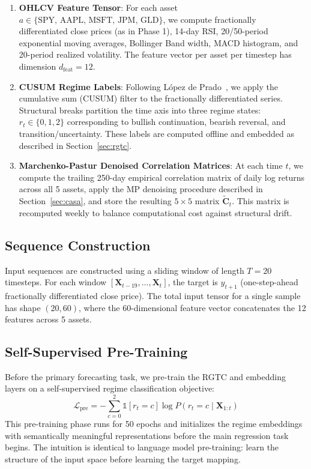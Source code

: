 \documentclass[conference]{IEEEtran}
\begin{document}
\begin{enumerate}[leftmargin=*]
    \item \textbf{OHLCV Feature Tensor}: For each asset $a \in \{\text{SPY, AAPL, MSFT, JPM, GLD}\}$, we compute fractionally differentiated close prices (as in Phase 1), 14-day RSI, 20/50-period exponential moving averages, Bollinger Band width, MACD histogram, and 20-period realized volatility. The feature vector per asset per timestep has dimension $d_{\text{feat}} = 12$.

    \item \textbf{CUSUM Regime Labels}: Following L\'{o}pez de Prado~\cite{lopez2018advances}, we apply the cumulative sum (CUSUM) filter to the fractionally differentiated series. Structural breaks partition the time axis into three regime states: $r_t \in \{0, 1, 2\}$ corresponding to bullish continuation, bearish reversal, and transition/uncertainty. These labels are computed offline and embedded as described in Section~\ref{sec:rgtc}.

    \item \textbf{Marchenko-Pastur Denoised Correlation Matrices}: At each time $t$, we compute the trailing 250-day empirical correlation matrix of daily log returns across all 5 assets, apply the MP denoising procedure described in Section~\ref{sec:casa}, and store the resulting $5 \times 5$ matrix $\tilde{\mathbf{C}}_t$. This matrix is recomputed weekly to balance computational cost against structural drift.
\end{enumerate}

\subsection{Sequence Construction}

Input sequences are constructed using a sliding window of length $T = 20$ timesteps. For each window $[\mathbf{X}_{t-19}, \ldots, \mathbf{X}_t]$, the target is $y_{t+1}$ (one-step-ahead fractionally differentiated close price). The total input tensor for a single sample has shape $(20, 60)$, where the 60-dimensional feature vector concatenates the 12 features across 5 assets.

\subsection{Self-Supervised Pre-Training}

Before the primary forecasting task, we pre-train the RGTC and embedding layers on a self-supervised regime classification objective:
\begin{equation}
\mathcal{L}_{\text{pre}} = -\sum_{c=0}^{2} \mathbb{1}[r_t = c] \log P(r_t = c \mid \mathbf{X}_{1:t})
\end{equation}
This pre-training phase runs for 50 epochs and initializes the regime embeddings with semantically meaningful representations before the main regression task begins. The intuition is identical to language model pre-training: learn the structure of the input space before learning the target mapping.
\end{document}
